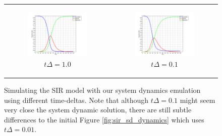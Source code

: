 \begin{figure}
\begin{center}
	\begin{tabular}{c c}
		\begin{subfigure}[b]{0.5\textwidth}
			\centering
			\includegraphics[width=.8\textwidth, angle=0]{./../shared/fig/frsd/SIR_SD_1000agents_150t_1dt.png}
			\caption{$t\Delta = 1.0$}
			\label{fig:sd_plot_10dt}
		\end{subfigure}
	
		& 
		
		\begin{subfigure}[b]{0.5\textwidth}
			\centering
			\includegraphics[width=.8\textwidth, angle=0]{./../shared/fig/frsd/SIR_SD_1000agents_150t_01dt.png}
			\caption{$t\Delta = 0.1$}
			\label{fig:sd_plot_0.1dt}
		\end{subfigure}
	\end{tabular}
	
	\caption{Simulating the SIR model with our system dynamics emulation using different time-deltas. Note that although $t\Delta = 0.1$ might seem very close the system dynamic solution, there are still subtle differences to the initial Figure \ref{fig:sir_sd_dynamics} which uses $t\Delta = 0.01$.}
	\label{fig:sd_plots}
\end{center}
\end{figure}

